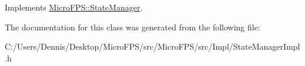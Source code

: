 Implements \hyperlink{class_micro_f_p_s_1_1_state_manager_a6fe3b8c2c4cc7f577438c5b1595d973c}{MicroFPS::StateManager}.



The documentation for this class was generated from the following file:\begin{DoxyCompactItemize}
\item 
C:/Users/Dennis/Desktop/MicroFPS/src/MicroFPS/src/Impl/StateManagerImpl.h\end{DoxyCompactItemize}
